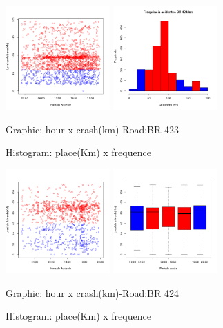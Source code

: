 \documentclass[conference,compsoc]{IEEEtran}
\begin{document}
\begin{figure}[ht]
\begin{center}
     \includegraphics[height=4.0cm]{graficos/br423_1.png}
     \includegraphics[height=4.0cm]{graficos/br423_2.png}
     \tiny{\caption{Graphic: hour x crash(km)-Road:BR 423}}
     \tiny{ \caption{Histogram: place(Km) x frequence}}
\end{center}
\end{figure}

\begin{figure}[ht]
\begin{center}
     \includegraphics[height=4.0cm]{graficos/br424_1.png}
     \includegraphics[height=4.0cm]{graficos/br424_2.png}
     \small{\caption{Graphic: hour x crash(km)-Road:BR 424}}
     \small{\caption{Histogram: place(Km) x frequence}}
\end{center}
\end{figure}
\end{document}
